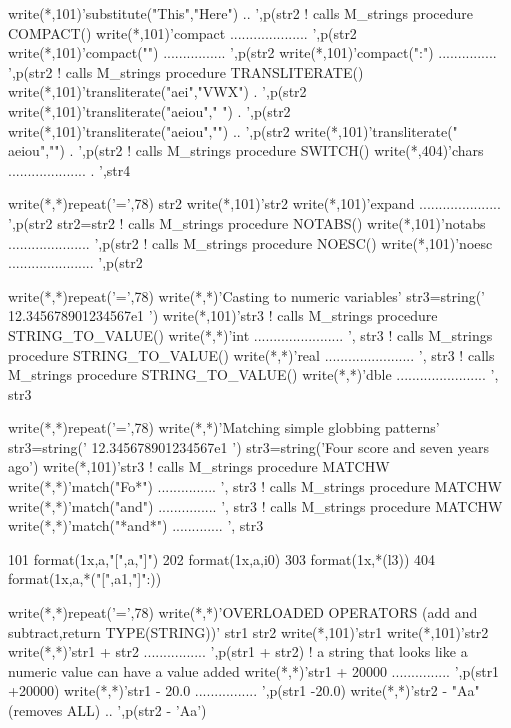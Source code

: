 \begin{DoxyVerb}
  write(*,101)'substitute("This","Here") .. ',p(str2%
  ! calls M_strings procedure COMPACT()
  write(*,101)'compact .................... ',p(str2%
  write(*,101)'compact("") ................ ',p(str2%
  write(*,101)'compact(":") ............... ',p(str2%
  ! calls M_strings procedure TRANSLITERATE()
  write(*,101)'transliterate("aei","VWX") . ',p(str2%
  write(*,101)'transliterate("aeiou"," ") . ',p(str2%
  write(*,101)'transliterate("aeiou","") .. ',p(str2%
  write(*,101)'transliterate(" aeiou","") . ',p(str2%
  ! calls M_strings procedure SWITCH()
  write(*,404)'chars .................... . ',str4%

  write(*,*)repeat('=',78)
  str2%
  write(*,101)'str2%
  write(*,101)'expand ..................... ',p(str2%
  str2=str2%
  ! calls M_strings procedure NOTABS()
  write(*,101)'notabs ..................... ',p(str2%
  ! calls M_strings procedure NOESC()
  write(*,101)'noesc ...................... ',p(str2%

  write(*,*)repeat('=',78)
  write(*,*)'Casting to numeric variables'
  str3=string('   12.345678901234567e1        ')
  write(*,101)'str3%
  ! calls M_strings procedure STRING_TO_VALUE()
  write(*,*)'int  ....................... ', str3%
  ! calls M_strings procedure STRING_TO_VALUE()
  write(*,*)'real ....................... ', str3%
  ! calls M_strings procedure STRING_TO_VALUE()
  write(*,*)'dble ....................... ', str3%

  write(*,*)repeat('=',78)
  write(*,*)'Matching simple globbing patterns'
  str3=string('   12.345678901234567e1        ')
  str3=string('Four score and seven years ago')
  write(*,101)'str3%
  ! calls M_strings procedure MATCHW
  write(*,*)'match("Fo*") ............... ', str3%
  ! calls M_strings procedure MATCHW
  write(*,*)'match("and") ............... ', str3%
  ! calls M_strings procedure MATCHW
  write(*,*)'match("*and*") ............. ', str3%

  101 format(1x,a,"[",a,"]")
  202 format(1x,a,i0)
  303 format(1x,*(l3))
  404 format(1x,a,*("[",a1,"]":))

  write(*,*)repeat('=',78)
  write(*,*)'OVERLOADED OPERATORS (add and subtract,return TYPE(STRING))'
  str1%
  str2%
  write(*,101)'str1%
  write(*,101)'str2%
  write(*,*)'str1 + str2 ................ ',p(str1 + str2)
  ! a string that looks like a numeric value can have a value added
  write(*,*)'str1 + 20000 ............... ',p(str1 +20000)
  write(*,*)'str1 - 20.0 ................ ',p(str1 -20.0)
  write(*,*)'str2 - "Aa" (removes ALL) .. ',p(str2 - 'Aa')


\end{DoxyVerb}
